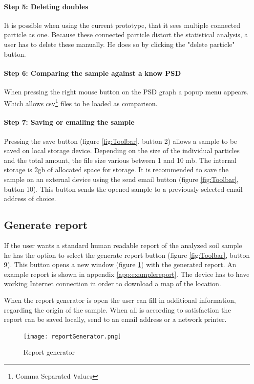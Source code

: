 \documentclass[11pt,fleqn,,a4paper,twoside,openright]{book}
\begin{document}
\paragraph{Step 5: Deleting doubles}
It is possible when using the current prototype, that it sees multiple connected particle as one. Because these connected particle distort the statistical analysis, a user has to delete these manually. He does so by clicking the "delete particle" button.

\paragraph{Step 6: Comparing the sample against a know PSD}
When pressing the right mouse button on the PSD graph a popup menu appears. Which allows csv\footnote{Comma Separated Values} files to be loaded as comparison.

\paragraph{Step 7: Saving or emailing the sample}
Pressing the save button (figure \ref{fig:Toolbar}, button 2) allows a sample to be saved on local storage device. Depending on the size of the individual particles and the total amount, the file size various between 1 and 10 mb. The internal storage is 2gb of allocated space for storage. It is recommended to save the sample on an external device using the send email button (figure \ref{fig:Toolbar}, button 10). This button sends the opened sample to a previously selected email address of choice.

\subsection{Generate report}
If the user wants a standard human readable report of the analyzed soil sample he has the option to select the generate report button (figure \ref{fig:Toolbar}, button 9). This button opens a new window (figure \ref{fig:Repgen}) with the generated report. An example report is shown in appendix \ref{app:examplereport}. The device has to have working Internet connection in order to download a map of the location.

When the report generator is open the user can fill in additional information, regarding the origin of the sample. When all is according to satisfaction the report can be saved locally, send to an email address or a network printer.
\begin{figure}[h]
	\centering
	\texttt{[image: reportGenerator.png]}
	\caption{Report generator}\label{fig:Repgen}
\end{figure}
 
\end{document}

